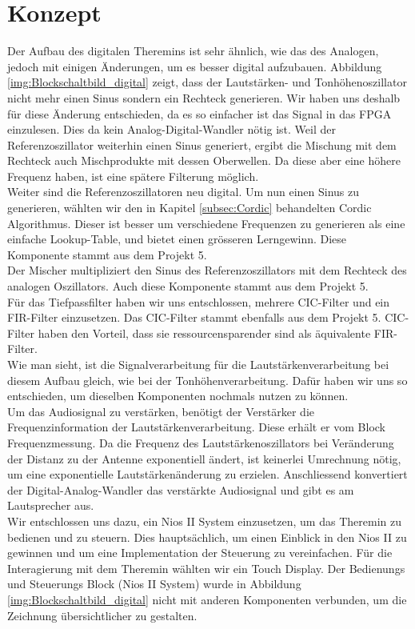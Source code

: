
\clearpage
\section{Konzept}\label{sec:Konzept}
Der Aufbau des digitalen Theremins ist sehr ähnlich, wie das des Analogen, jedoch mit einigen Änderungen, um es besser digital aufzubauen. Abbildung \ref{img:Blockschaltbild_digital} zeigt, dass der Lautstärken- und Tonhöhenoszillator nicht mehr einen Sinus sondern ein Rechteck generieren. Wir haben uns deshalb für diese Änderung entschieden, da es so einfacher ist das Signal in das FPGA einzulesen. Dies da kein Analog-Digital-Wandler nötig ist. Weil der Referenzoszillator weiterhin einen Sinus generiert, ergibt die Mischung mit dem Rechteck auch Mischprodukte mit dessen Oberwellen. Da diese aber eine höhere Frequenz haben, ist eine spätere Filterung möglich.\\
Weiter sind die Referenzoszillatoren neu digital. Um nun einen Sinus zu generieren, wählten wir den in Kapitel \ref{subsec:Cordic} behandelten Cordic Algorithmus. Dieser ist besser um verschiedene Frequenzen zu generieren als eine einfache Lookup-Table, und bietet einen grösseren Lerngewinn. Diese Komponente stammt aus dem Projekt 5. \\
Der Mischer multipliziert den Sinus des Referenzoszillators mit dem Rechteck des analogen Oszillators. Auch diese Komponente stammt aus dem Projekt 5.\\
Für das Tiefpassfilter haben wir uns entschlossen, mehrere CIC-Filter und ein FIR-Filter einzusetzen. Das CIC-Filter stammt ebenfalls aus dem Projekt 5. CIC-Filter haben den Vorteil, dass sie ressourcensparender sind als äquivalente FIR-Filter.\\
Wie man sieht, ist die Signalverarbeitung für die Lautstärkenverarbeitung bei diesem Aufbau gleich, wie bei der Tonhöhenverarbeitung. Dafür haben wir uns so entschieden, um dieselben Komponenten nochmals nutzen zu können.\\
Um das Audiosignal zu verstärken, benötigt der Verstärker die Frequenzinformation der Lautstärkenverarbeitung. Diese erhält er vom Block Frequenzmessung. Da die Frequenz des Lautstärkenoszillators bei Veränderung der Distanz zu der Antenne exponentiell ändert, ist keinerlei Umrechnung nötig, um eine exponentielle Lautstärkenänderung zu erzielen.
Anschliessend konvertiert der Digital-Analog-Wandler das verstärkte Audiosignal und gibt es am Lautsprecher aus.\\
Wir entschlossen uns dazu, ein Nios II System einzusetzen, um das Theremin zu bedienen und zu steuern. Dies hauptsächlich, um einen Einblick in den Nios II zu gewinnen und um eine Implementation der Steuerung zu vereinfachen. Für die Interagierung mit dem Theremin wählten wir ein Touch Display. Der Bedienungs und Steuerungs Block (Nios II System) wurde in Abbildung \ref{img:Blockschaltbild_digital} nicht mit anderen Komponenten verbunden, um die Zeichnung übersichtlicher zu gestalten.

